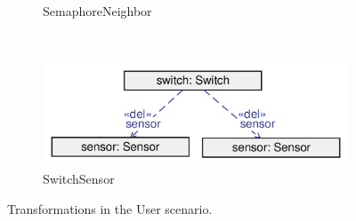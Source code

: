 \begin{figure}
\begin{subfigure}[b]{0.4\textwidth}
                \caption{\textsf{SemaphoreNeighbor}}
                \label{fig:transformation-user-semaphoreneighbor}
        \end{subfigure}%
        ~
        \begin{subfigure}[b]{0.6\textwidth}
                \centering
                \includegraphics[scale=0.4]{figures/transformation-user-switchsensor}
                \caption{\textsf{SwitchSensor}}
                \label{fig:transformation-user-switchsensor}
        \end{subfigure}
        \caption{Transformations in the User scenario.}
        \label{fig:transformations-repair}
\end{figure}


